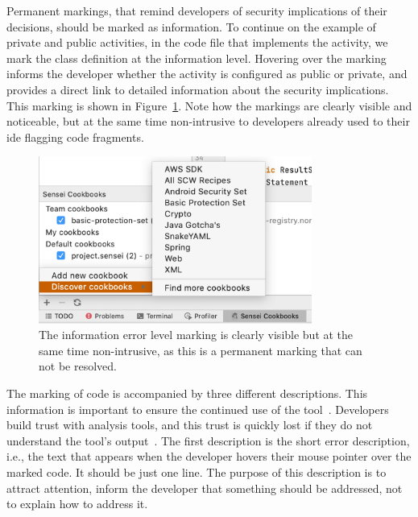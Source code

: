 Permanent markings, that remind developers of security implications of their decisions, should be marked as information.
To continue on the example of private and public activities, in the code file that implements the activity, we mark the class definition at the information level.
Hovering over the marking informs the developer whether the activity is configured as public or private, and provides a direct link to detailed information about the security implications.
This marking is shown in Figure~\ref{fig:infomarking}.
Note how the markings are clearly visible and noticeable, but at the same time non-intrusive to developers already used to their \gls{ide} flagging code fragments.

\begin{figure}
  \centering
  \includegraphics[width=0.8\textwidth,page=10]{04-tools/figures/figures1.pdf}
  \caption[Marking at the information error level]{The information error level marking is clearly visible but at the same time non-intrusive, as this is a permanent marking that can not be resolved.}
  \label{fig:infomarking} 
\end{figure}

The marking of code is accompanied by three different descriptions.
This information is important to ensure the continued use of the tool~\cite{whitney2018embedding,layman2007toward}.
Developers build trust with analysis tools, and this trust is quickly lost if they do not understand the tool’s output~\cite{bessey2010few}.
The first description is the short error description, i.e., the text that appears when the developer hovers their mouse pointer over the marked code.
It should be just one line.
The purpose of this description is to attract attention, inform the developer that something should be addressed, not to explain how to address it.

